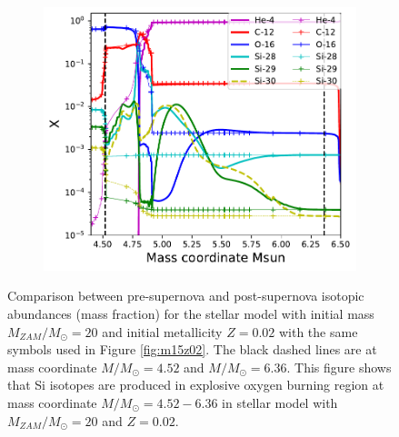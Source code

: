 \documentclass{brandeis-thesis3.2}
\def \msun {M_{\odot}}
\begin{document}
\begin{figure}[H]
    \centering
    \begin{subfigure}[c]{0.6\textwidth}
        \includegraphics[width=\textwidth]{figs/200.02.pdf}
    \end{subfigure}
    \caption{Comparison between pre-supernova and post-supernova isotopic abundances (mass fraction) for the stellar model with initial mass $M_{ZAM}/\msun =20$ and initial metallicity $Z=0.02$ with the same symbols used in Figure \ref{fig:m15z02}. The black dashed lines are at mass coordinate $M/\msun = 4.52$ and $M/\msun = 6.36$. This figure shows that Si isotopes are produced in explosive oxygen burning region at mass coordinate $M/\msun = 4.52-6.36$ in stellar model with $M_{ZAM}/\msun =20$ and $Z=0.02$.}
    \label{fig:m20z02}
\end{figure}
\end{document}
